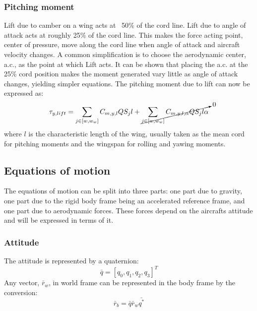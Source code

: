 \subsubsection{Pitching moment}
Lift due to camber on a wing acts at ~50\% of the cord line.
Lift due to angle of attack acts at roughly 25\% of the cord line.\cite{aerodynamics}
This makes the force acting point, center of pressure, move along the cord line when angle of attack and aircraft velocity changes.
A common simplification is to choose the aerodynamic center, a.c., as the point at which Lift acts.
It can be shown that placing the a.c. at the 25\% cord position 
makes the moment generated vary little as angle of attack changes, yielding simpler equations.
The pitching moment due to lift can now be expressed as:
\begin{equation}
    \tau_{y,lift} = \sum_{j \in [w, w_w]}
    C_{m,y,l} Q S_j l +  \cancelto{0}{\sum_{j \in [w, w_w]}
    C_{m,y,l,\alpha} Q S_j l \alpha}
\end{equation}
where $l$ is the characteristic length of the wing, usually taken as the mean cord for pitching moments and the wingspan for rolling and yawing moments.

\subsection{Equations of motion}

The equations of motion can be split into three parts: one part due to gravity, one part due to the rigid body frame being an accelerated reference frame, and one part due to aerodynamic forces.
These forces depend on the aircrafts attitude and will be expressed in terms of it.

\subsubsection{Attitude}
The attitude is represented by a quaternion:
\begin{equation}
\bar{q} = [q_0, q_1, q_2, q_3]^T
\end{equation}
Any vector, $\bar{r}_w$, in world frame can be represented in the body frame by the conversion:
\begin{equation}
    \bar{r}_b = \bar{q} \bar{r}_w \bar{q^*}
\end{equation}


